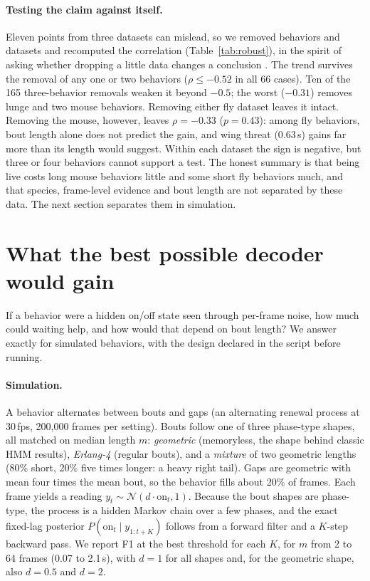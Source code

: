 \documentclass[10pt]{article}
\begin{document}
\paragraph{Testing the claim against itself.} Eleven points from three datasets can mislead, so we removed behaviors and datasets and recomputed the correlation (Table~\ref{tab:robust}), in the spirit of asking whether dropping a little data changes a conclusion \citep{broderick2020amip}. The trend survives the removal of any one or two behaviors ($\rho \le -0.52$ in all 66 cases). Ten of the 165 three-behavior removals weaken it beyond $-0.5$; the worst ($-0.31$) removes lunge and two mouse behaviors. Removing either fly dataset leaves it intact. Removing the mouse, however, leaves $\rho=-0.33$ ($p=0.43$): among fly behaviors, bout length alone does not predict the gain, and wing threat (0.63\,s) gains far more than its length would suggest. Within each dataset the sign is negative, but three or four behaviors cannot support a test. The honest summary is that being live costs long mouse behaviors little and some short fly behaviors much, and that species, frame-level evidence and bout length are not separated by these data. The next section separates them in simulation.

\section{What the best possible decoder would gain}
\label{sec:synthetic}

If a behavior were a hidden on/off state seen through per-frame noise, how much could waiting help, and how would that depend on bout length? We answer exactly for simulated behaviors, with the design declared in the script before running.

\paragraph{Simulation.} A behavior alternates between bouts and gaps (an alternating renewal process at 30\,fps, 200{,}000 frames per setting). Bouts follow one of three phase-type shapes, all matched on median length $m$: \emph{geometric} (memoryless, the shape behind classic HMM results), \emph{Erlang-4} (regular bouts), and a \emph{mixture} of two geometric lengths (80\% short, 20\% five times longer: a heavy right tail). Gaps are geometric with mean four times the mean bout, so the behavior fills about 20\% of frames. Each frame yields a reading $y_t \sim \mathcal{N}(d\cdot \mathrm{on}_t, 1)$. Because the bout shapes are phase-type, the process is a hidden Markov chain over a few phases, and the exact fixed-lag posterior $P(\mathrm{on}_t \mid y_{1:t+K})$ follows from a forward filter and a $K$-step backward pass. We report F1 at the best threshold for each $K$, for $m$ from 2 to 64 frames (0.07 to 2.1\,s), with $d=1$ for all shapes and, for the geometric shape, also $d=0.5$ and $d=2$.
\end{document}
